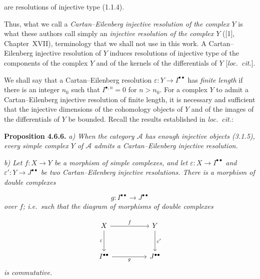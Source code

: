 \clearpage
{}%
\begingroup\small\setlength{\parskip}{0pt}\setlength{\emergencystretch}{1.5em}
\setlength{\abovedisplayskip}{4pt plus 2pt minus 2pt}%
\setlength{\belowdisplayskip}{4pt plus 2pt minus 2pt}%

\noindent are resolutions of injective type (1.1.4).

Thus, what we call a \emph{Cartan--Eilenberg injective resolution of the
complex $Y$} is what these authors call simply an \emph{injective
resolution of the complex $Y$} ([1], Chapter~XVII), terminology that we
shall not use in this work. A Cartan--Eilenberg injective resolution of
$Y$ induces resolutions of injective type of the components of the
complex $Y$ and of the kernels of the differentials of $Y$
[\emph{loc.\ cit.}].

We shall say that a Cartan--Eilenberg resolution
$\varepsilon\colon Y\longrightarrow I^{\bullet\bullet}$ has
\emph{finite length} if there is an integer $n_0$ such that
$I^{\bullet,n}=0$ for $n>n_0$. For a complex $Y$ to admit a
Cartan--Eilenberg injective resolution of finite length, it is necessary
and sufficient that the injective dimensions of the cohomology objects of
$Y$ and of the images of the differentials of $Y$ be bounded. Recall the
results established in \emph{loc.\ cit.}:

\medskip\noindent\textbf{Proposition 4.6.6.}\quad
\textit{a) When the category $\mathcal A$ has enough injective objects
(3.1.5), every simple complex $Y$ of $\mathcal A$ admits a
Cartan--Eilenberg injective resolution.}

\noindent\textit{b) Let
$f\colon X\longrightarrow Y$ be a morphism of simple complexes, and let
$\varepsilon\colon X\longrightarrow I^{\bullet\bullet}$ and
$\varepsilon'\colon Y\longrightarrow J^{\bullet\bullet}$ be two
Cartan--Eilenberg injective resolutions. There is a morphism of double
complexes}

\[
\textit{$g\colon I^{\bullet\bullet}\longrightarrow J^{\bullet\bullet}$}
\]
\textit{over $f$; i.e.\ such that the diagram of morphisms of double
complexes}

\[
\begin{tikzcd}[column sep=5.0em,row sep=3.0em]
X \arrow[r,"f"] \arrow[d,"\varepsilon"'] &
Y \arrow[d,"\varepsilon'"] \\
I^{\bullet\bullet} \arrow[r,"g"'] &
J^{\bullet\bullet}
\end{tikzcd}
\]
\textit{is commutative.}

